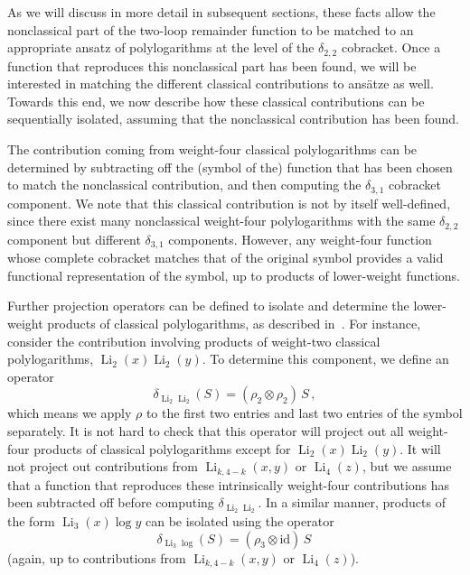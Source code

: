 \documentclass[11pt]{article}
\DeclareMathOperator{\Li}{Li}
\begin{document}
As we will discuss in more detail in subsequent sections, these facts allow the nonclassical part of the two-loop remainder function to be matched to an appropriate ansatz of polylogarithms at the level of the $\delta_{2,2}$ cobracket. Once a function that reproduces this nonclassical part has been found, we will be interested in matching the different classical contributions to ans\"atze as well. Towards this end, we now describe how these classical contributions can be sequentially isolated, assuming that the nonclassical contribution has been found.

The contribution coming from weight-four classical polylogarithms can be determined by subtracting off the (symbol of the) function that has been chosen to match the nonclassical contribution, and then computing the $\delta_{3,1}$ cobracket component. We note that this classical contribution is not by itself well-defined, since there exist many nonclassical weight-four polylogarithms with the same $\delta_{2,2}$ component but different $\delta_{3,1}$ components. However, any weight-four function whose complete cobracket matches that of the original symbol provides a valid functional representation of the symbol, up to products of lower-weight functions.  

Further projection operators can be defined to isolate and determine the lower-weight products of classical polylogarithms, as described in~\cite{Goncharov:2010jf}. For instance, consider the contribution involving products of weight-two classical polylogarithms, $\Li_2(x) \Li_2(y)$. To determine this component, we define an operator
\begin{equation}
\delta_{\Li_2 \Li_2} (S)= (\rho_2 \otimes \rho_2)\, S \, , \label{eq:proj_op_1}
\end{equation}
which means we apply $\rho$ to the first two entries and last two entries of the symbol separately. It is not hard to check that this operator will project out all weight-four products of classical polylogarithms except for $\Li_2(x) \Li_2(y)$. It will not project out contributions from $\Li_{k,4-k}(x,y)$ or $\Li_4(z)$, but we assume that a function that reproduces these intrinsically weight-four contributions has been subtracted off before computing $\delta_{\Li_2 \Li_2}$. In a similar manner, products of the form $\Li_3(x) \log y$ can be isolated using the operator
\begin{equation}
\delta_{\Li_3 \log} (S)= (\rho_3 \otimes \text{id})\, S \,  \label{eq:proj_op_2} 
\end{equation}
(again, up to contributions from $\Li_{k,4-k}(x,y)$ or $\Li_4(z)$). 
\end{document}
